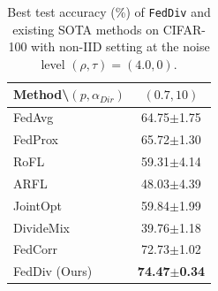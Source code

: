 \documentclass[letterpaper]{article} %
\begin{document}
\begin{table}[t]
    \centering
    \tiny
    \begin{tabular}{l|c}
        \toprule
        \midrule
        \textbf{Method}\textbackslash $(p, \alpha_{Dir})$ & $(0.7, 10)$ \\
        \midrule
        FedAvg~\cite{FedAvg}             & 64.75$\pm$1.75          \\
        FedProx~\cite{FedProx}           & 65.72$\pm$1.30          \\
        RoFL~\cite{RoFL}                 & 59.31$\pm$4.14          \\
        ARFL~\cite{ARFL}                 & 48.03$\pm$4.39          \\
        JointOpt~\cite{JointOpt}         & 59.84$\pm$1.99          \\
        DivideMix~\cite{li2019dividemix} & 39.76$\pm$1.18          \\
        FedCorr~\cite{xu2022fedcorr}     & 72.73$\pm$1.02          \\
        FedDiv (Ours)                    & \textbf{74.47$\pm$0.34} \\
        \bottomrule
    \end{tabular}%
    \caption{Best test accuracy (\%) of \texttt{FedDiv} and existing SOTA methods on CIFAR-100 with non-IID setting at the noise level $(\rho, \tau)=(4.0, 0)$.}
    \label{Table:CIFAR100-NonIID}%
\end{table}%


\begin{table}[t]
    \centering
    \caption{Best test accuracy (\%) of \texttt{FedDiv} and existing SOTA methods on Clothing1M with non-IID setting.}
    \label{Table:Clothing-1M}%
    
\end{table}%
\end{document}
